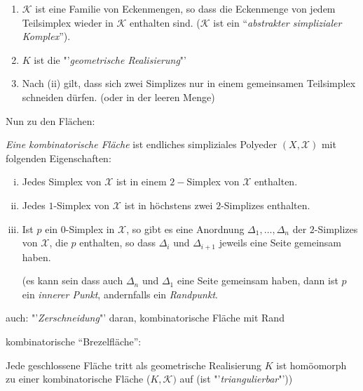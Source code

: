 \documentclass[a4paper,10pt]{scrartcl}
\begin{document}
\begin{note*}
 \begin{enumerate}[(1)]
  \item $\mathcal K$ ist eine Familie von Eckenmengen, so dass die Eckenmenge von jedem Teilsimplex wieder in $\mathcal K$ enthalten sind. ($\mathcal K$ ist ein "`\emph{abstrakter simplizialer Komplex}"').
  \item $K$ ist die "'\emph{geometrische Realisierung}"'
  \item Nach (ii) gilt, dass sich zwei Simplizes nur in einem gemeinsamen Teilsimplex schneiden dürfen. (oder in der leeren Menge)
\end{enumerate}
\end{note*}
Nun zu den Flächen:
\begin{df}
 \emph{Eine kombinatorische  Fläche} ist endliches simpliziales Polyeder $(X, \mathcal X)$ mit folgenden Eigenschaften:
\begin{enumerate}[(i)]
 \item Jedes Simplex von $\mathcal X$ ist in einem $2-$Simplex von $\mathcal X$ enthalten.
 \item Jedes $1$-Simplex von $\mathcal X$ ist in höchstens zwei $2$-Simplizes enthalten.
 \begin{figure}[H]
 \centering
\fixme[fig124]
\caption{}
\end{figure}
 \item Ist $p$ ein $0$-Simplex in $\mathcal X$, so gibt es eine Anordnung $\Delta_1,\dotsc  ,\Delta_n$ der $2$-Simplizes
von $\mathcal X$, die $p$ enthalten, so dass $\Delta_i$ und $\Delta_{i+1}$ jeweils eine Seite gemeinsam haben.
 \begin{figure}[H]
 \centering
\fixme[fig125]
\caption{}
\end{figure}
(es kann sein dass auch $\Delta_n$ und $\Delta_1$ eine Seite gemeinsam haben, dann ist $p$ ein \emph{innerer Punkt}, andernfalls ein \emph{Randpunkt}.
\end{enumerate}
\end{df}
\begin{exs*} 
\begin{figure}[H]
 \centering
\fixme[fig126]
\caption{}
\end{figure}
auch: "'\emph{Zerschneidung}"' daran, kombinatorische Fläche mit Rand
 \begin{figure}[H]
 \centering
\fixme[fig127]
\caption{}
\end{figure}
kombinatorische "`Brezelfläche"':
 \begin{figure}[H]
 \centering
\fixme[fig128]
\caption{}
\end{figure}
\end{exs*}
\begin{st}[Rado 1924]
 Jede geschlossene Fläche tritt als geometrische Realisierung $K$ ist homöomorph zu einer kombinatorische Fläche ($K, \mathcal K)$ auf (ist "'\emph{triangulierbar}"'))
\end{st}
\end{document}
